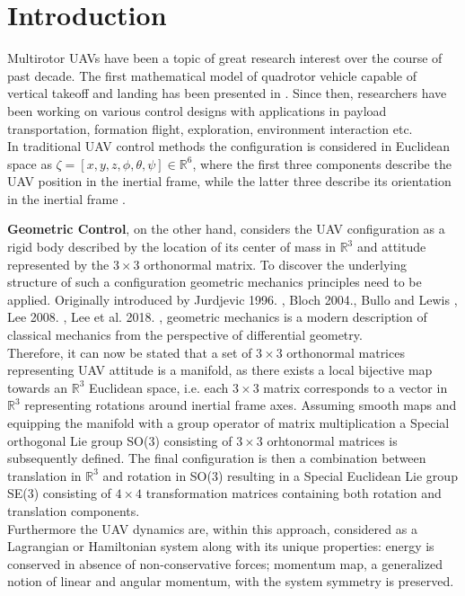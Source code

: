 \section{Introduction}

Multirotor UAVs have been a topic of great research interest over the course of past decade. The first mathematical model of quadrotor vehicle capable of vertical takeoff and landing has been presented in \cite{hamel2002quad}. Since then, researchers have been working on various control designs with applications in payload transportation, formation flight, exploration, environment interaction etc.\\
In traditional UAV control methods the configuration is considered in Euclidean space as $\zeta = [x, y, z, \phi, \theta, \psi] \in \mathbb{R}^6$, where the first three components describe the UAV position in the inertial frame, while the latter three describe its orientation in the inertial frame \cite{uavModel}.

\noindent \textbf{Geometric Control}, on the other hand, considers the UAV configuration as a rigid body described by the location of its center of mass in $\mathbb{R}^3$ and attitude represented by the $3\times3$ orthonormal matrix. To discover the underlying structure of such a configuration geometric mechanics principles need to be applied. Originally introduced by Jurdjevic 1996. \cite{jurdjevic_1996}, Bloch 2004.\cite{bloch}, Bullo and Lewis \cite{bulloBook}, Lee 2008. \cite{Lee2008ComputationalGM}, Lee et al. 2018. \cite{LeeModel}, geometric mechanics is a modern description of classical mechanics from the perspective of differential geometry. \\
Therefore, it can now be stated that a set of $3\times3$ orthonormal matrices representing UAV attitude is a manifold, as there exists a local bijective map towards an $\mathbb{R}^3$ Euclidean space, i.e. each $3\times3$ matrix corresponds to a vector in $\mathbb{R}^3$ representing rotations around inertial frame axes. Assuming smooth maps and equipping the manifold with a group operator of matrix multiplication a Special orthogonal Lie group SO(3) consisting of $3\times3$ orhtonormal matrices is subsequently defined. The final configuration is then a combination between translation in $\mathbb{R}^3$ and rotation in SO(3) resulting in a Special Euclidean Lie group SE(3) consisting of $4\times4$ transformation matrices containing both rotation and translation components. \\ 
Furthermore the UAV dynamics are, within this approach, considered as a Lagrangian or Hamiltonian system along with its unique properties: energy is conserved in absence of non-conservative forces; momentum map, a generalized notion of linear and angular momentum, with the system symmetry is preserved.


